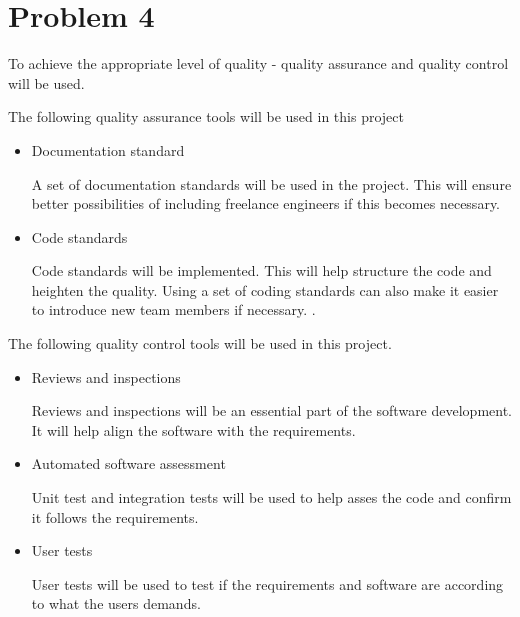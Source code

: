 \chapter{Problem 4}
To achieve the appropriate level of quality - quality assurance and quality control will be used.
\begin{description}[align=left]
	\setlength\itemsep{0.1em}
	\item The following quality assurance tools will be used in this project
	\begin{itemize}
		\item Documentation standard
		
			A set of documentation standards will be used in the project. This will ensure better possibilities of including freelance engineers if this becomes necessary.
			
		\item Code standards
		
			Code standards will be implemented. This will help structure the code and heighten the quality. Using a set of coding standards can also make it easier to introduce new team members if necessary.
			. 
	\end{itemize}
	\item The following quality control tools will be used in this project.
	
	\begin{itemize}
		\item Reviews and inspections
		
			Reviews and inspections will be an essential part of the software development. It will help align the software with the requirements.
		\item Automated software assessment
		
			Unit test and integration tests will be used to help asses the code and confirm it follows the requirements. 
		\item User tests
			
			User tests will be used to test if the requirements and software are according to what the users demands. 
	\end{itemize}
\end{description}